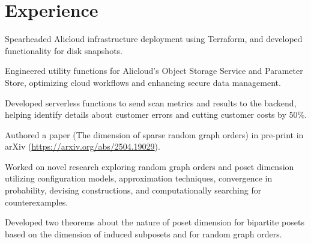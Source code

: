 \section{Experience}

\begin{resumeItem}
\begin{resumeList}
    \item Spearheaded Alicloud infrastructure deployment using Terraform, and developed functionality for disk snapshots.
    \item Engineered utility functions for Alicloud's Object Storage Service and Parameter Store, optimizing cloud workflows and enhancing secure data management.
    \item Developed serverless functions to send scan metrics and results to the backend, helping identify details about customer errors and cutting customer costs by 50\%.
\end{resumeList}
\end{resumeItem}

\begin{resumeItem}
\begin{resumeList}
    \item Authored a paper (The dimension of sparse random graph orders) in pre-print in arXiv (\href{https://arxiv.org/abs/2504.19029}{https://arxiv.org/abs/2504.19029}).
    \item Worked on novel research exploring random graph orders and poset dimension utilizing configuration models, approximation techniques, convergence in probability, devising constructions, and computationally searching for counterexamples. 
    \item Developed two theorems about the nature of poset dimension for bipartite posets based on the dimension of induced subposets and for random graph orders.
\end{resumeList}
\end{resumeItem}

